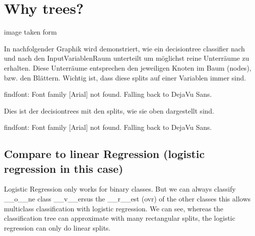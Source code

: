 \documentclass[letterpaper,10pt,english]{jupyterBook}
\begin{document}
\chapter{Why trees?}
\label{\detokenize{Tree_Methods:why-trees}}\label{\detokenize{Tree_Methods::doc}}
\noindent{}

\sphinxAtStartPar
image taken form 

\sphinxAtStartPar
In nachfolgender Graphik wird demonstriert, wie ein decision\sphinxhyphen{}tree classifier nach und nach den Input\sphinxhyphen{}Variablen\sphinxhyphen{}Raum unterteilt um möglichst reine Unterräume zu erhalten. Diese Unterräume entsprechen den jeweiligen Knoten im Baum (nodes), bzw. den Blättern.
Wichtig ist, dass diese splits auf einer Variablen immer  sind.

\begin{sphinxVerbatim}[commandchars=\\\{\}]
findfont: Font family [\PYGZsq{}Arial\PYGZsq{}] not found. Falling back to DejaVu Sans.
\end{sphinxVerbatim}

\noindent{}

\sphinxAtStartPar
Dies ist der decision\sphinxhyphen{}trees mit den splits, wie sie oben dargestellt sind.

\begin{sphinxVerbatim}[commandchars=\\\{\}]
findfont: Font family [\PYGZsq{}Arial\PYGZsq{}] not found. Falling back to DejaVu Sans.
\end{sphinxVerbatim}

\noindent{}


\section{Compare to linear Regression (logistic regression in this case)}
\label{\detokenize{Tree_Methods:compare-to-linear-regression-logistic-regression-in-this-case}}
\sphinxAtStartPar
Logistic Regression only works for binary classes. But we can always classify \_\_o\_\_ne class \_\_v\_\_ersus the \_\_r\_\_est (ovr) of the other classes \sphinxhyphen{} this allows multiclass classification with logistic regression.
We can see, whereas the classification tree can approximate  with many rectangular splits, the logistic regression can only do linear splits.
\end{document}
